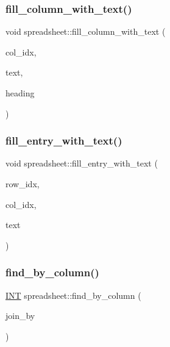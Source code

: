 \subsubsection{\texorpdfstring{fill\+\_\+column\+\_\+with\+\_\+text()}{fill\_column\_with\_text()}}
{\footnotesize\ttfamily void spreadsheet\+::fill\+\_\+column\+\_\+with\+\_\+text (\begin{DoxyParamCaption}\item[{\mbox{\hyperlink{galois_8h_a09fddde158a3a20bd2dcadb609de11dc}{I\+NT}}}]{col\+\_\+idx,  }\item[{const \mbox{\hyperlink{galois_8h_ab6cc7b4aeb6ea31aba2b3fbfc83ff5e6}{B\+Y\+TE}} $\ast$$\ast$}]{text,  }\item[{const \mbox{\hyperlink{galois_8h_ab6cc7b4aeb6ea31aba2b3fbfc83ff5e6}{B\+Y\+TE}} $\ast$}]{heading }\end{DoxyParamCaption})}

\mbox{\label{classspreadsheet_a566b10f622f02ea407a41f00942d9d03}} 
\subsubsection{\texorpdfstring{fill\+\_\+entry\+\_\+with\+\_\+text()}{fill\_entry\_with\_text()}}
{\footnotesize\ttfamily void spreadsheet\+::fill\+\_\+entry\+\_\+with\+\_\+text (\begin{DoxyParamCaption}\item[{\mbox{\hyperlink{galois_8h_a09fddde158a3a20bd2dcadb609de11dc}{I\+NT}}}]{row\+\_\+idx,  }\item[{\mbox{\hyperlink{galois_8h_a09fddde158a3a20bd2dcadb609de11dc}{I\+NT}}}]{col\+\_\+idx,  }\item[{const \mbox{\hyperlink{galois_8h_ab6cc7b4aeb6ea31aba2b3fbfc83ff5e6}{B\+Y\+TE}} $\ast$}]{text }\end{DoxyParamCaption})}

\mbox{\label{classspreadsheet_ab4331f5b9d533ced7946faec1cb61cff}} 
\subsubsection{\texorpdfstring{find\+\_\+by\+\_\+column()}{find\_by\_column()}}
{\footnotesize\ttfamily \mbox{\hyperlink{galois_8h_a09fddde158a3a20bd2dcadb609de11dc}{I\+NT}} spreadsheet\+::find\+\_\+by\+\_\+column (\begin{DoxyParamCaption}\item[{const \mbox{\hyperlink{galois_8h_ab6cc7b4aeb6ea31aba2b3fbfc83ff5e6}{B\+Y\+TE}} $\ast$}]{join\+\_\+by }\end{DoxyParamCaption})}

